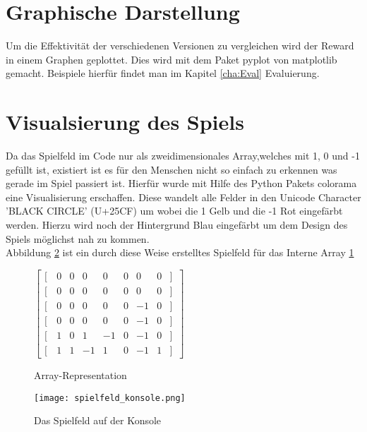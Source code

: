 \section{Graphische Darstellung}
Um die Effektivität der verschiedenen Versionen zu vergleichen wird der Reward in einem Graphen geplottet. Dies wird mit dem Paket pyplot von matplotlib gemacht. Beispiele hierfür findet man im Kapitel \ref{cha:Eval}  Evaluierung. \\


\section{Visualsierung des Spiels}
\label{sec:visualisierung}
Da das Spielfeld im Code nur als zweidimensionales Array,welches mit 1, 0 und -1 gefüllt ist, existiert ist es für den Menschen nicht so einfach zu erkennen was gerade im Spiel passiert ist. Hierfür wurde mit Hilfe des Python Pakets colorama eine Visualisierung erschaffen. Diese wandelt alle Felder in den Unicode Character 'BLACK CIRCLE' (U+25CF) um wobei die 1 Gelb und die -1 Rot eingefärbt werden. Hierzu wird noch der Hintergrund Blau eingefärbt um dem Design des Spiels möglichst nah zu kommen. \\
Abbildung \ref{fig:spielfeld_konsole} ist ein durch diese Weise erstelltes Spielfeld für das Interne Array \ref{fig:array}\\
\begin{figure}[ht]
\centering
$\begin{bmatrix}                                
[ \, & 0  & 0 & 0 & 0 & 0 & 0 & 0& ]\, \\                                               
[ \, & 0  & 0 & 0 & 0 & 0 & 0 & 0& ]\, \\  
[ \, & 0  & 0 & 0 & 0 & 0 & -1 & 0& ]\, \\  
[ \, & 0  & 0 & 0 & 0 & 0 & -1 & 0& ]\, \\  
[ \, & 1  & 0 & 1 & -1 & 0 & -1 & 0& ]\, \\  
[ \, & 1  & 1 & -1 & 1 & 0 & -1 & 1& ]\,                                               
\end{bmatrix}$
\caption{Array-Representation}
 \label{fig:array}
\end{figure}


\begin{figure}[h!]
  \texttt{[image: spielfeld\_konsole.png]}
  \centering
  \caption{Das Spielfeld auf der Konsole}
  \label{fig:spielfeld_konsole}
\end{figure}

